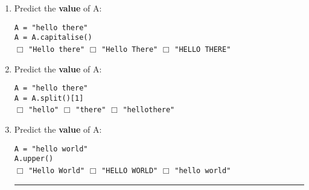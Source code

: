 \documentclass[11pt]{report}
\begin{document}
\begin{enumerate}
    \item Predict the \textbf{value} of A:

    {\tt A = "hello there"}\\
    {\tt A = A.capitalise()}\\
    $\Box$ {\tt "Hello there"} \hspace{3em} $\Box$ {\tt "Hello There"} \hspace{3em} $\Box$ {\tt "HELLO THERE"}

    \item Predict the \textbf{value} of A:

    {\tt A = "hello there"}\\
    {\tt A = A.split()[1]}\\
    $\Box$ {\tt "hello"} \hspace{3em} $\Box$ {\tt "there"} \hspace{3em} $\Box$ {\tt "hellothere"}

    \item Predict the \textbf{value} of A:

    {\tt A = "hello world"}\\
    {\tt A.upper()}\\
    $\Box$ {\tt "Hello World"} \hspace{3em} $\Box$ {\tt "HELLO WORLD"} \hspace{3em} $\Box$ {\tt "hello world"}

    \vspace{2em}
    \hrule
    \vspace{1em}

\end{enumerate}
\end{document}
